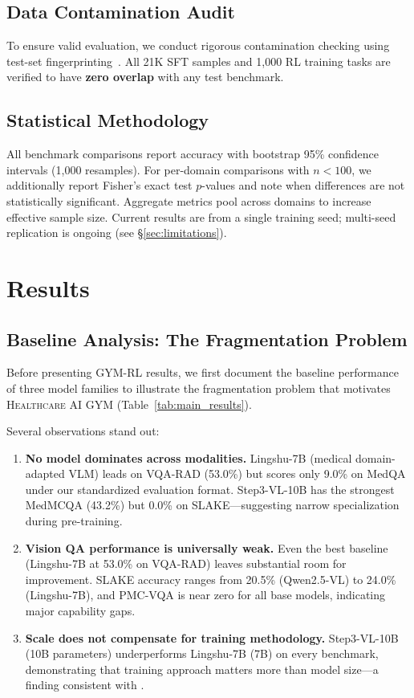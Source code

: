 \documentclass{article}
\newcommand{\gym}{\textsc{Healthcare AI GYM}}
\newcommand{\ours}{\textsc{GYM-RL}}
\begin{document}
\subsection{Data Contamination Audit}

To ensure valid evaluation, we conduct rigorous contamination checking using test-set fingerprinting~\citep{yang2023rethinking}. All 21K SFT samples and 1,000 RL training tasks are verified to have \textbf{zero overlap} with any test benchmark.

\subsection{Statistical Methodology}

All benchmark comparisons report accuracy with bootstrap 95\% confidence intervals (1,000 resamples). For per-domain comparisons with $n < 100$, we additionally report Fisher's exact test $p$-values and note when differences are not statistically significant. Aggregate metrics pool across domains to increase effective sample size. Current results are from a single training seed; multi-seed replication is ongoing (see \S\ref{sec:limitations}).


\section{Results}
\label{sec:results}

\subsection{Baseline Analysis: The Fragmentation Problem}
\label{sec:baselines}

Before presenting \ours{} results, we first document the baseline performance of three model families to illustrate the fragmentation problem that motivates \gym{} (Table~\ref{tab:main_results}).

Several observations stand out:
\begin{enumerate}[nosep, leftmargin=*]
    \item \textbf{No model dominates across modalities.} Lingshu-7B (medical domain-adapted VLM) leads on VQA-RAD (53.0\%) but scores only 9.0\% on MedQA under our standardized evaluation format. Step3-VL-10B has the strongest MedMCQA (43.2\%) but 0.0\% on SLAKE---suggesting narrow specialization during pre-training.
    \item \textbf{Vision QA performance is universally weak.} Even the best baseline (Lingshu-7B at 53.0\% on VQA-RAD) leaves substantial room for improvement. SLAKE accuracy ranges from 20.5\% (Qwen2.5-VL) to 24.0\% (Lingshu-7B), and PMC-VQA is near zero for all base models, indicating major capability gaps.
    \item \textbf{Scale does not compensate for training methodology.} Step3-VL-10B (10B parameters) underperforms Lingshu-7B (7B) on every benchmark, demonstrating that training approach matters more than model size---a finding consistent with \citet{chen2023meditron}.
\end{enumerate}
\end{document}
